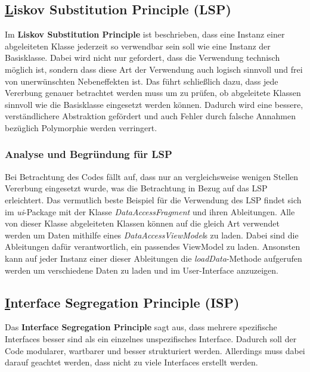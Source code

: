 \newpage
\subsection{\underline{L}iskov Substitution Principle (LSP)}

Im \textbf{Liskov Substitution Principle} ist beschrieben, dass eine Instanz einer abgeleiteten Klasse jederzeit so verwendbar sein soll wie eine Instanz der Basisklasse.
Dabei wird nicht nur gefordert, dass die Verwendung technisch möglich ist, sondern dass diese Art der Verwendung auch logisch sinnvoll und frei von unerwünschten Nebeneffekten ist.
Das führt schließlich dazu, dass jede Vererbung genauer betrachtet werden muss um zu prüfen, ob abgeleitete Klassen sinnvoll wie die Basisklasse eingesetzt werden können.
Dadurch wird eine bessere, verständlichere Abstraktion gefördert und auch Fehler durch falsche Annahmen bezüglich Polymorphie werden verringert.

\subsubsection{Analyse und Begründung für LSP}
Bei Betrachtung des Codes fällt auf, dass nur an vergleichsweise wenigen Stellen Vererbung eingesetzt wurde, was die Betrachtung in Bezug auf das LSP erleichtert.
Das vermutlich beste Beispiel für die Verwendung des LSP findet sich im \textit{ui}-Package mit der Klasse \textit{DataAccessFragment} und ihren Ableitungen.
Alle von dieser Klasse abgeleiteten Klassen können auf die gleich Art verwendet werden um Daten mithilfe eines \textit{DataAccessViewModel}s zu laden.
Dabei sind die Ableitungen dafür verantwortlich, ein passendes ViewModel zu laden.
Ansonsten kann auf jeder Instanz einer dieser Ableitungen die \textit{loadData}-Methode aufgerufen werden um verschiedene Daten zu laden und im User-Interface anzuzeigen.


\newpage
\subsection{\underline{I}nterface Segregation Principle (ISP)}

Das \textbf{Interface Segregation Principle} sagt aus, dass mehrere spezifische Interfaces besser sind als ein einzelnes unspezifisches Interface.
Dadurch soll der Code modularer, wartbarer und besser strukturiert werden. 
Allerdings muss dabei darauf geachtet werden, dass nicht zu viele Interfaces erstellt werden.

